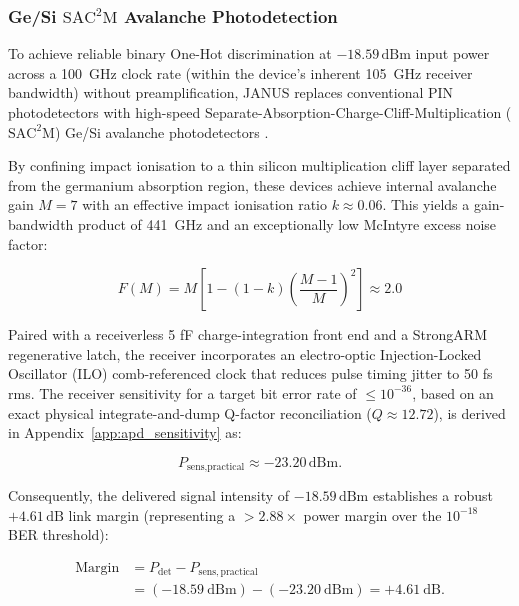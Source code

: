 \documentclass[journal]{IEEEtran}
\begin{document}
\subsubsection{\textbf{Ge/Si $\mathrm{SAC^2M}$ Avalanche Photodetection}}

To achieve reliable binary One-Hot discrimination at $-18.59\,\text{dBm}$ input power across a 100~GHz clock rate (within the device's inherent 105~GHz receiver bandwidth) without preamplification, JANUS replaces conventional PIN photodetectors with high-speed Separate-Absorption-Charge-Cliff-Multiplication ($\mathrm{SAC^2M}$) Ge/Si avalanche photodetectors \cite{Chen2025}. 

By confining impact ionisation to a thin silicon multiplication cliff layer separated from the germanium absorption region, these devices achieve internal avalanche gain $M = 7$ with an effective impact ionisation ratio $k \approx 0.06$. This yields a gain-bandwidth product of 441~GHz and an exceptionally low McIntyre excess noise factor:

\begin{equation}
F(M) = M\left[1-(1-k)
\left(\frac{M-1}{M}\right)^2\right]
\approx 2.0
\end{equation}

Paired with a receiverless 5 fF charge-integration front end and a StrongARM regenerative latch, the receiver incorporates an electro-optic Injection-Locked Oscillator (ILO) comb-referenced clock that reduces pulse timing jitter to 50 fs rms. The receiver sensitivity for a target bit error rate of $\le 10^{-36}$, based on an exact physical integrate-and-dump Q-factor reconciliation ($Q \approx 12.72$), is derived in Appendix~\ref{app:apd_sensitivity} as:

\begin{equation}
P_{\text{sens,practical}} \approx -23.20\,\text{dBm}.
\end{equation}

Consequently, the delivered signal intensity of $-18.59\,\text{dBm}$ establishes a robust $+4.61\,\text{dB}$ link margin (representing a $> 2.88\times$ power margin over the $10^{-18}$ BER threshold):

\begin{equation}
\begin{aligned}
\mathrm{Margin}
&= P_{\mathrm{det}} - P_{\mathrm{sens,practical}} \\
&= (-18.59~\mathrm{dBm}) - (-23.20~\mathrm{dBm})
= +4.61~\mathrm{dB}.
\end{aligned}
\end{equation}
\end{document}
